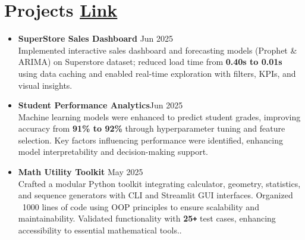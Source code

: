 \documentclass[10 pt, letterpaper]{article}
\begin{document}
\section*{Projects \textbar \href{https://github.com/Seetharamanrs?tab=repositories} {Link}}
\begin{itemize}
 \item \textbf{SuperStore Sales Dashboard } \hfill{Jun 2025} \\Implemented interactive sales dashboard and forecasting models (Prophet \& ARIMA) on Superstore dataset; reduced load time from \textbf{0.40s to 0.01s} using data caching and enabled real-time exploration with filters, KPIs, and visual insights.



    \vspace{-0.23cm}
     \item \textbf{Student Performance Analytics}\hfill{Jun 2025} \\Machine learning models were enhanced to predict student grades, improving accuracy from \textbf{91\% to 92\%} through hyperparameter tuning and feature selection. Key factors influencing performance were identified, enhancing model interpretability and decision-making support.

    \vspace{-0.23cm}
    \item\textbf{Math Utility Toolkit }\hfill{ May 2025}\\ Crafted a modular Python toolkit integrating calculator, geometry, statistics, and sequence generators with CLI and Streamlit GUI interfaces. Organized ~1000 lines of code using OOP principles to ensure scalability and maintainability. Validated functionality with \textbf{25\texttt{+}} test cases, enhancing accessibility to essential mathematical tools..


\end{itemize}
\end{document}

